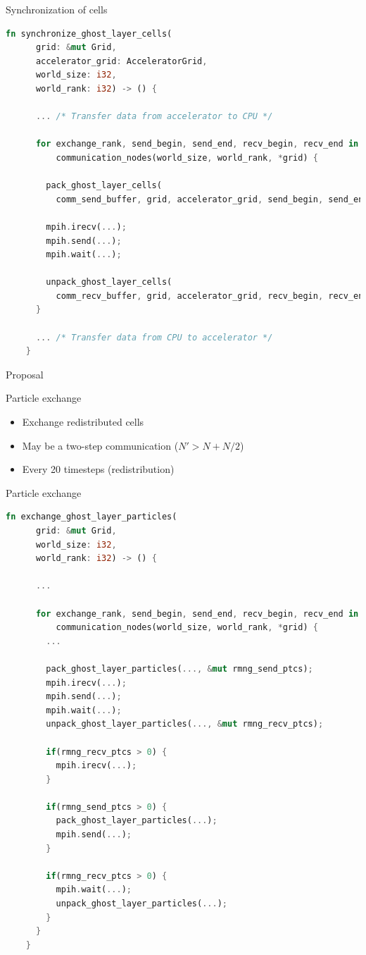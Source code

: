 \documentclass[aspectratio=43,t]{beamer}
\begin{document}
  \begin{frame}[fragile]{Synchronization of cells}
    \begin{lstlisting}[basicstyle=\tiny\ttfamily,language=Rust]
    fn synchronize_ghost_layer_cells(
      grid: &mut Grid,
      accelerator_grid: AcceleratorGrid,
      world_size: i32,
      world_rank: i32) -> () {

      ... /* Transfer data from accelerator to CPU */

      for exchange_rank, send_begin, send_end, recv_begin, recv_end in
          communication_nodes(world_size, world_rank, *grid) {

        pack_ghost_layer_cells(
          comm_send_buffer, grid, accelerator_grid, send_begin, send_end);

        mpih.irecv(...);
        mpih.send(...);
        mpih.wait(...);

        unpack_ghost_layer_cells(
          comm_recv_buffer, grid, accelerator_grid, recv_begin, recv_end);
      }

      ... /* Transfer data from CPU to accelerator */
    }
    \end{lstlisting}
  \end{frame}

  \begin{frame}{Proposal}
    \begin{block}{Particle exchange}
      \begin{itemize}
        \item Exchange redistributed cells
        \item May be a two-step communication ($N' > N + N/2$)
        \item Every 20 timesteps (redistribution)
      \end{itemize}
    \end{block}
  \end{frame}

  \begin{frame}[fragile]{Particle exchange}
    \begin{lstlisting}[basicstyle=\tiny\ttfamily,language=Rust]
    fn exchange_ghost_layer_particles(
      grid: &mut Grid,
      world_size: i32,
      world_rank: i32) -> () {

      ...

      for exchange_rank, send_begin, send_end, recv_begin, recv_end in
          communication_nodes(world_size, world_rank, *grid) {
        ...

        pack_ghost_layer_particles(..., &mut rmng_send_ptcs);
        mpih.irecv(...);
        mpih.send(...);
        mpih.wait(...);
        unpack_ghost_layer_particles(..., &mut rmng_recv_ptcs);

        if(rmng_recv_ptcs > 0) {
          mpih.irecv(...);
        }

        if(rmng_send_ptcs > 0) {
          pack_ghost_layer_particles(...);
          mpih.send(...);
        }

        if(rmng_recv_ptcs > 0) {
          mpih.wait(...);
          unpack_ghost_layer_particles(...);
        }
      }
    }
    \end{lstlisting}
  \end{frame}
  
\end{document}
